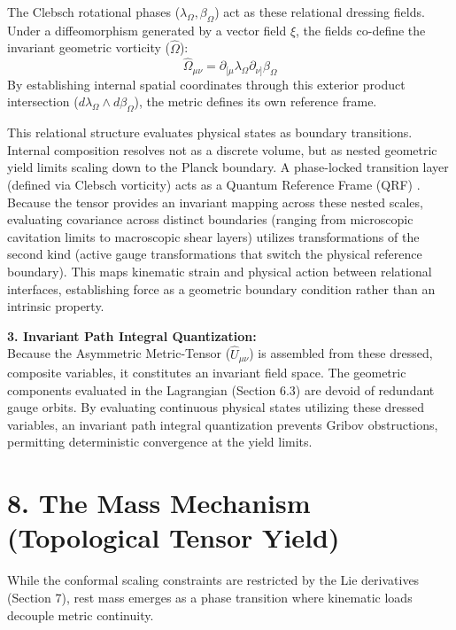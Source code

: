 The Clebsch rotational phases ($\lambda_\Omega, \beta_\Omega$) act as these relational dressing fields. Under a diffeomorphism generated by a vector field $\xi$, the fields co-define the invariant geometric vorticity ($\hat{\Omega}$):
\begin{equation}
    \hat{\Omega}_{\mu\nu} = \partial_{[\mu} \lambda_\Omega \partial_{\nu]} \beta_\Omega
\end{equation}
By establishing internal spatial coordinates through this exterior product intersection ($d \lambda_\Omega \wedge d \beta_\Omega$), the metric defines its own reference frame. 

This relational structure evaluates physical states as boundary transitions. Internal composition resolves not as a discrete volume, but as nested geometric yield limits scaling down to the Planck boundary. A phase-locked transition layer (defined via Clebsch vorticity) acts as a Quantum Reference Frame (QRF) \cite{Giacomini2019, Rovelli1996}.  Because the tensor provides an invariant mapping across these nested scales, evaluating covariance across distinct boundaries (ranging from microscopic cavitation limits to macroscopic shear layers) utilizes transformations of the second kind (active gauge transformations that switch the physical reference boundary). This maps kinematic strain and physical action between relational interfaces, establishing force as a geometric boundary condition rather than an intrinsic property.


\textbf{3. Invariant Path Integral Quantization:} \\
Because the Asymmetric Metric-Tensor ($\hat{U}_{\mu\nu}$) is assembled from these dressed, composite variables, it constitutes an invariant field space. 
The geometric components evaluated in the Lagrangian (Section 6.3) are devoid of redundant gauge orbits. By evaluating continuous physical states utilizing these dressed variables, an invariant path integral quantization prevents Gribov obstructions, permitting deterministic convergence at the yield limits. 


\section*{8. The Mass Mechanism (Topological Tensor Yield)}
\label{sec:deriv_mass_mechanism}
While the conformal scaling constraints are restricted by the Lie derivatives (Section 7), rest mass emerges as a phase transition where kinematic loads decouple metric continuity.


